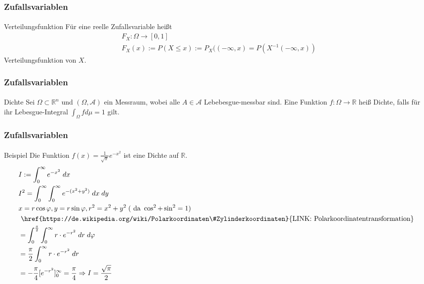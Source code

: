 \documentclass{beamer}
\begin{document}
\begin{frame}
    \frametitle{Zufallsvariablen}
\framesubtitle{}

\begin{block}{Verteilungsfunktion}
Für eine reelle Zufallsvariable heißt 
\begin{align*} 
& F_X : \Omega \to [0,1] \\
& F_X (x) := P (X \leq x) := P_X (( -\infty, x ) = P(X^{-1} (-\infty, x))
\end{align*}
Verteilungsfunktion von $X$.
\end{block}
 \end{frame}

\begin{frame}
    \frametitle{Zufallsvariablen}
\framesubtitle{}

\begin{block}{Dichte}
Sei $\Omega \subset \mathbb{R}^n$ und $(\Omega, \mathcal{A})$ ein Messraum, wobei alle $A \in \mathcal{A}$ Lebebesgue-messbar sind.
 Eine Funktion $f: \Omega \to \mathbb{R}$ heiß Dichte, falls für ihr Lebesgue-Integral $\int_{\Omega} f d \mu = 1$ gilt.
\end{block}
 \end{frame}

\begin{frame}
    \frametitle{Zufallsvariablen}
\framesubtitle{}
\begin{block}{Beispiel}
Die Funktion $f(x) = \frac{1}{\sqrt{\pi}} e^{- x^2}$ ist eine Dichte auf $ \mathbb{R}$.
\begin{align*}
& I := \int_{0}^{\infty} e^{-x^2} \; dx\\
& I^2 = \int_{0}^{\infty} \int_{0}^{\infty} e^{-(x^2+y^2)} \; dx \;dy \\
&x=r \cos \varphi ,y=r\sin \varphi ,r^2 = x^2 + y^2  \; (\text{ da } \cos^2 + \sin^2 = 1)\\
 &\text{ \href{https://de.wikipedia.org/wiki/Polarkoordinaten\#Zylinderkoordinaten}{LINK: Polarkoordinatentransformation}} \\
& = \int_{0}^{\frac{\pi}{2}}  \int_{0}^{\infty}r \cdot e^{-r^2} \; dr \;d\varphi \\
&= \frac{\pi}{2} \int_{0}^{\infty}r \cdot e^{-r^2} \; dr \\
&= -\frac{\pi}{4} [e^{-r^2} ]_0^{\infty} = \frac{\pi}{4} \Rightarrow I = \frac{\sqrt{\pi}}{2}
\end{align*}
\end{block}
 \end{frame}
\end{document}
